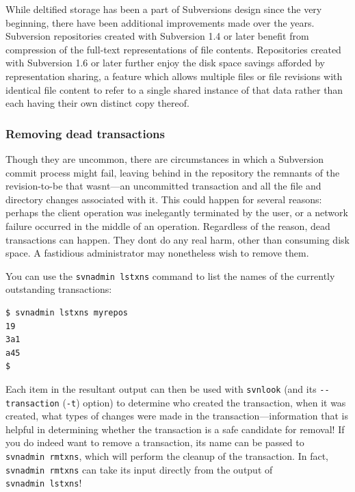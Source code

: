 While deltified storage has been a part of Subversion\textquotesingle s
design since the very beginning, there have been additional improvements
made over the years. Subversion repositories created with Subversion 1.4
or later benefit from compression of the full-text representations of
file contents. Repositories created with Subversion 1.6 or later further
enjoy the disk space savings afforded by representation sharing, a
feature which allows multiple files or file revisions with identical
file content to refer to a single shared instance of that data rather
than each having their own distinct copy thereof.

\subsubsection{Removing dead
transactions}\label{svn.reposadmin.maint.diskspace.deadtxns}

Though they are uncommon, there are circumstances in which a Subversion
commit process might fail, leaving behind in the repository the remnants
of the revision-to-be that wasn\textquotesingle t---an uncommitted
transaction and all the file and directory changes associated with it.
This could happen for several reasons: perhaps the client operation was
inelegantly terminated by the user, or a network failure occurred in the
middle of an operation. Regardless of the reason, dead transactions can
happen. They don\textquotesingle t do any real harm, other than
consuming disk space. A fastidious administrator may nonetheless wish to
remove them.

You can use the \texttt{svnadmin\ lstxns} command to list the names of
the currently outstanding transactions:

\begin{verbatim}
$ svnadmin lstxns myrepos
19
3a1
a45
$
\end{verbatim}

Each item in the resultant output can then be used with \texttt{svnlook}
(and its \texttt{-\/-transaction} (\texttt{-t}) option) to determine who
created the transaction, when it was created, what types of changes were
made in the transaction---information that is helpful in determining
whether the transaction is a safe candidate for removal! If you do
indeed want to remove a transaction, its name can be passed to
\texttt{svnadmin\ rmtxns}, which will perform the cleanup of the
transaction. In fact, \texttt{svnadmin\ rmtxns} can take its input
directly from the output of \texttt{svnadmin\ lstxns}!

